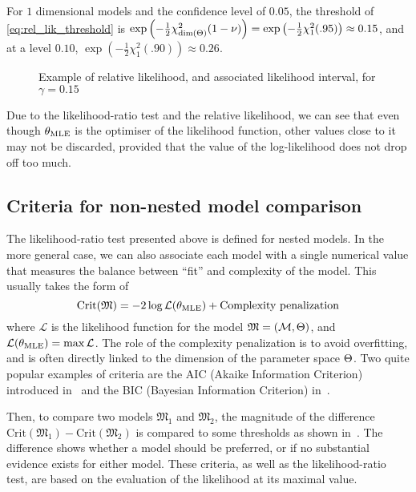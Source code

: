 \documentclass[../../Main_ManuscritThese.tex]{subfiles}
\newcommand\imgpath{/home/victor/acadwriting/Manuscrit/Text/Chapter2/img/}
\begin{document}
For $1$ dimensional models and the confidence level of $0.05$, the
threshold of \cref{eq:rel_lik_threshold} is
$\exp\left(-\frac{1}{2}\chi^2_{\mathrm{dim}(\Theta)}(1-\nu)\right) =
\exp\left(-\frac{1}{2}\chi^2_{1}(.95)\right) \approx 0.15$, and at a
level $0.10$,
$\exp\left(-\frac{1}{2}\chi^2_{1}(.90)\right) \approx 0.26$.

\begin{figure}[ht]
  \centering 
  
  \caption{\label{fig:relative_likelihood} Example of relative likelihood, and associated likelihood interval, for $\gamma=0.15$}
\end{figure}

Due to the likelihood-ratio test and the relative likelihood, we can
see that even though ${\theta}_{\mathrm{MLE}}$ is the optimiser of the
likelihood function, other values close to it may not be discarded,
provided that the value of the log-likelihood does not drop off too
much.

\subsection{Criteria for non-nested model comparison}
\label{sec:criteria_AIC}
The likelihood-ratio test presented above is defined for nested
models. In the more general case, we can also associate each model
with a single numerical value that measures the balance between
``fit'' and complexity of the model. This usually takes the form of
\begin{equation}
  \mathrm{Crit}(\mathfrak{M})=-2 \log \mathcal{L} ({\theta}_{\mathrm{MLE}}) + \text{Complexity penalization}
\end{equation}
where $\mathcal{L}$ is the likelihood function for the model
$\mathfrak{M} = (\mathcal{M},\Theta)$, and
$\mathcal{L}({\theta}_{\mathrm{MLE}}) = \max \mathcal{L}$. The role of the
complexity penalization is to avoid overfitting, and is often directly
linked to the dimension of the parameter space $\Theta$.  Two quite
popular examples of criteria are the AIC (Akaike Information
Criterion) introduced in~\cite{akaike_new_1974} and the BIC (Bayesian
Information Criterion) in~\cite{schwarz_estimating_1978}.

Then, to compare two models $\mathfrak{M}_1$ and $\mathfrak{M}_2$, the
magnitude of the difference
$\mathrm{Crit}(\mathfrak{M}_1) - \mathrm{Crit}(\mathfrak{M}_2)$ is
compared to some thresholds as shown
in~\cite{burnham_multimodel_2004}.  The difference shows whether a
model should be preferred, or if no substantial evidence exists for
either model.  These criteria, as well as the likelihood-ratio test,
are based on the evaluation of the likelihood at its maximal value.
\end{document}

